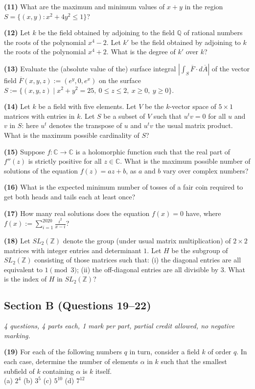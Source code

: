 \documentclass[11pt,a4paper]{article}
\newcommand{\Z}{\mathbb{Z}}
\newcommand{\Q}{\mathbb{Q}}
\newcommand{\C}{\mathbb{C}}
\newcommand{\examsec}[1]{%
  \subsection*{#1}
  \vspace{-2pt}
}
\newcommand{\qitem}[1]{\par\medskip\noindent\textbf{#1}\hspace{0.5em}}
\begin{document}
\qitem{(11)} What are the maximum and minimum values of $x + y$ in the region $S = \{(x, y) : x^2 + 4y^2 \le 1\}$?

\qitem{(12)} Let $k$ be the field obtained by adjoining to the field $\Q$ of rational numbers the roots of the polynomial $x^4 - 2$. Let $k'$ be the field obtained by adjoining to $k$ the roots of the polynomial $x^4 + 2$. What is the degree of $k'$ over $k$?

\qitem{(13)} Evaluate the (absolute value of the) surface integral $\left|\int_S \overline{F}\cdot d\overline{A}\right|$ of the vector field $\overline{F}(x, y, z) := (e^y, 0, e^x)$ on the surface $S := \{(x, y, z) \mid x^2 + y^2 = 25,\ 0 \le z \le 2,\ x \ge 0,\ y \ge 0\}$.

\qitem{(14)} Let $k$ be a field with five elements. Let $V$ be the $k$-vector space of $5 \times 1$ matrices with entries in $k$. Let $S$ be a subset of $V$ such that $u^t v = 0$ for all $u$ and $v$ in $S$: here $u^t$ denotes the transpose of $u$ and $u^t v$ the usual matrix product. What is the maximum possible cardinality of $S$?

\qitem{(15)} Suppose $f : \C \to \C$ is a holomorphic function such that the real part of $f''(z)$ is strictly positive for all $z \in \C$. What is the maximum possible number of solutions of the equation $f(z) = az + b$, as $a$ and $b$ vary over complex numbers?

\qitem{(16)} What is the expected minimum number of tosses of a fair coin required to get both heads and tails each at least once?

\qitem{(17)} How many real solutions does the equation $f(x) = 0$ have, where $f(x) := \displaystyle\sum_{i=1}^{2020} \frac{i^2}{x - i}$?

\qitem{(18)} Let $SL_2(\Z)$ denote the group (under usual matrix multiplication) of $2 \times 2$ matrices with integer entries and determinant $1$. Let $H$ be the subgroup of $SL_2(\Z)$ consisting of those matrices such that: (i) the diagonal entries are all equivalent to $1 \pmod{3}$; (ii) the off-diagonal entries are all divisible by $3$. What is the index of $H$ in $SL_2(\Z)$?

\examsec{Section B (Questions 19--22)}
\noindent\emph{4 questions, 4 parts each, 1 mark per part, partial credit allowed, no negative marking.}

\qitem{(19)} For each of the following numbers $q$ in turn, consider a field $k$ of order $q$. In each case, determine the number of elements $\alpha$ in $k$ such that the smallest subfield of $k$ containing $\alpha$ is $k$ itself.\\
(a) $2^4$ \qquad (b) $3^5$ \qquad (c) $5^{10}$ \qquad (d) $7^{12}$
\end{document}
